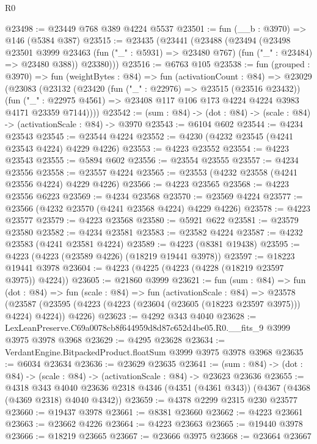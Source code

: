 \begin{lexlean}{R0}
\begin{coremodule}
@23498 := @23449 @768 @389 @4224 @5537
@23501 := fun (__b : @3970) => @146 (@5384 @387)
@23515 := @23435
    (@23441
      (@23488
        (@23494
          (@23498
            @23501
            @3999
            @23463
            (fun ("_" : @5931) => @23480 @767)
            (fun ("_" : @23484) => @23480 @388))
          @23380)))
@23516 := @6763 @105
@23538 := fun (grouped : @3970) =>
  fun (weightBytes : @84) =>
  fun (activationCount : @84) =>
  @23029
    (@23083
      (@23132
        (@23420
          (fun ("_" : @22976) => @23515 (@23516 @23432))
          (fun ("_" : @22975 @4561) =>
          @23408 @117 @106 @173 @4224 @4224 @3983 @4171 @23359 @7144))))
@23542 := (sum : @84) -> (dot : @84) -> (scale : @84) -> (activationScale : @84) -> @3970
@23543 := @6104 @602
@23544 := @4234 @23543
@23545 := @23544 @4224
@23552 := @4230 (@4232 @23545 (@4241 @23543 @4224) @4229 @4226)
@23553 := @4223 @23552
@23554 := @4223 @23543
@23555 := @5894 @602
@23556 := @23554 @23555
@23557 := @4234 @23556
@23558 := @23557 @4224
@23565 := @23553 (@4232 @23558 (@4241 @23556 @4224) @4229 @4226)
@23566 := @4223 @23565
@23568 := @4223 @23556 @6223
@23569 := @4234 @23568
@23570 := @23569 @4224
@23577 := @23566 (@4232 @23570 (@4241 @23568 @4224) @4229 @4226)
@23578 := @4223 @23577
@23579 := @4223 @23568
@23580 := @5921 @622
@23581 := @23579 @23580
@23582 := @4234 @23581
@23583 := @23582 @4224
@23587 := @4232 @23583 (@4241 @23581 @4224)
@23589 := @4223 (@8381 @19438)
@23595 := @4223 (@4223 (@23589 @4226) (@18219 @19441 @3978))
@23597 := @18223 @19441 @3978
@23604 := @4223 (@4225 (@4223 (@4228 (@18219 @23597 @3975)) @4224))
@23605 := @21860 @3999
@23621 := fun (sum : @84) =>
  fun (dot : @84) =>
  fun (scale : @84) =>
  fun (activationScale : @84) =>
  @23578 (@23587 (@23595 (@4223 (@4223 (@23604 (@23605 (@18223 @23597 @3975))) @4224) @4224)) @4226)
@23623 := @4292 @343 @4040
@23628 := LexLeanPreserve.C69a0078cb8f644959d8d87c652d4be05.R0.__fits_9 @3999 @3975 @3978 @3968
@23629 := @4295 @23628
@23634 := VerdantEngine.BitpackedProduct.floatSum @3999 @3975 @3978 @3968
@23635 := @6034 @23634
@23636 := @23629 @23635
@23641 := (sum : @84) -> (dot : @84) -> (scale : @84) -> (activationScale : @84) -> @23623 @23636
@23655 := @4318
    @343
    @4040
    @23636
    @2318
    @4346
    (@4351 (@4361 @343))
    (@4367 (@4368 (@4369 @2318) @4040 @4342))
@23659 := @4378 @2299 @2315 @230 @23577
@23660 := @19437 @3978
@23661 := @8381 @23660
@23662 := @4223 @23661
@23663 := @23662 @4226
@23664 := @4223 @23663
@23665 := @19440 @3978
@23666 := @18219 @23665
@23667 := @23666 @3975
@23668 := @23664 @23667

\end{coremodule}
\end{lexlean}
